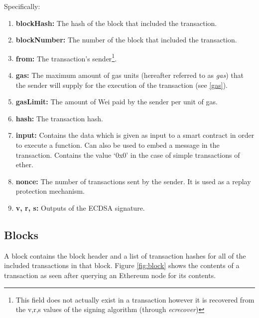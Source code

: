 
Specifically:
\begin{enumerate}
    \item \textbf{blockHash:} The hash of the block that included the transaction.
    \item \textbf{blockNumber:} The number of the block that included the transaction.
    \item \textbf{from:} The transaction's sender\footnote{This field does not actually exist in a transaction however it is recovered from the v,r,s values of the signing algorithm (through \textit{ecrecover})}.
    \item \textbf{gas:} The maximum amount of gas units (hereafter referred to as \textit{gas}) that the sender will supply for the execution of the transaction (see \ref{gas}).
    \item \textbf{gasLimit:} The amount of Wei paid by the sender per unit of gas.
    \item \textbf{hash:} The transaction hash.
    \item \textbf{input:} Contains the data which is given as input to a smart contract in order to execute a function. Can also be used to embed a message in the transaction. Contains the value `0x0' in the case of simple transactions of ether.
    \item \textbf{nonce:} The number of transactions sent by the sender. It is used as a replay protection mechanism.
    \item \textbf{v, r, s:} Outputs of the ECDSA signature.
\end{enumerate}

\subsection{Blocks} \label{block}
A block contains the block header and a list of transaction hashes for all of the included transactions in that block. Figure \ref{fig:block} shows the contents of a transaction as seen after querying an Ethereum node for its contents.


